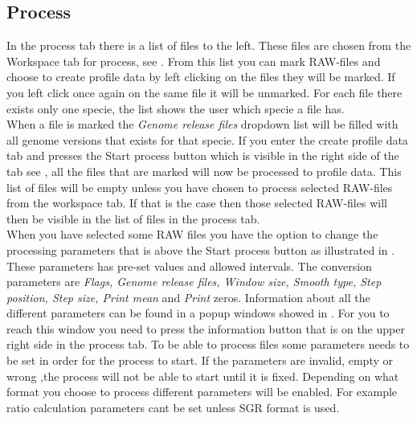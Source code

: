 \subsection{Process}
In the process tab there is a list of files to the left. These files are chosen from the Workspace tab for process, see . From this list you can mark RAW-files and choose to create profile data by left clicking on the files they will be marked. If you left click once again on the same file it will be unmarked. For each file there exists only one specie, the list shows the user which specie a file has. \\ When a file is marked the \emph{Genome release files} dropdown list will be filled with all genome versions that exists for that specie. If you enter the create profile data tab and presses the Start process button which is visible in the right side of the tab see , all the files that are marked will now be processed to profile data. This list of files will be empty unless you have chosen to process selected RAW-files from the workspace tab. If that is the case then those selected RAW-files will then be visible in the list of files in the process tab. \\ When you have selected some RAW files you have the option to change the processing parameters that is above the Start process button as illustrated in . These parameters has pre-set values and allowed intervals. The conversion parameters are \emph{Flags, Genome release files, Window size, Smooth type, Step position, Step size, Print mean} and \emph{Print} zeros. Information about all the different parameters can be found in a popup windows showed in . For you to reach this window you need to press the information button that is on the upper right side in the process tab. To be able to process files some parameters needs to be set in order for the process to start. If the parameters are invalid, empty or wrong  ,the process will not be able to start until it is fixed. Depending on what format you choose to process different parameters will be enabled. For example ratio calculation parameters cant be set unless SGR format is used.

